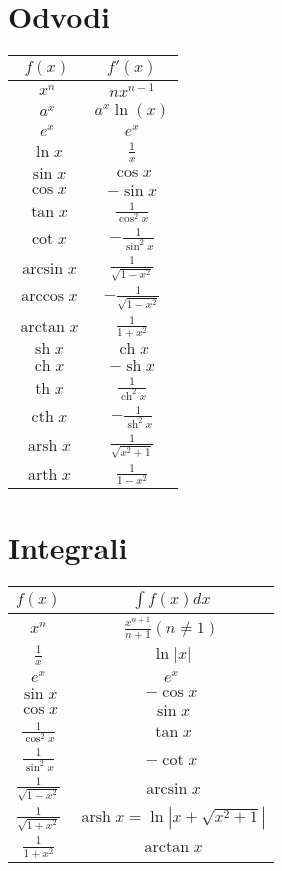 \documentclass[a4paper,oneside,10pt]{article}
\title{\Title}
\author{\Author}
\date{\today}
\theoremstyle{definition}
\DeclareMathOperator\ch{ch}
\DeclareMathOperator\sh{sh}
\DeclareMathOperator\Th{th}  %
\DeclareMathOperator\cth{cth}
\DeclareMathOperator\arsh{arsh}
\DeclareMathOperator\arth{arth}
\newcommand\abs[1]{\left|#1\right|}
\begin{document}
\begin{multicols}{2}
	\section*{Odvodi}
	\begin{tabular}[h]{|c|c|}
		\hline
		$f(x)$ & $f'(x)$ \\
		\hline
		$x^n$ & $nx^{n-1}$\\
		$a^x$ & $a^x\ln(x)$\\
		$e^x$ & $e^x$\\
		$\ln{x}$ & $\frac{1}{x}$\\
		$\sin{x}$ & $\cos{x}$\\
		$\cos{x}$ & $-\sin{x}$\\
		$\tan{x}$ & $\frac{1}{\cos^2{x}}$\\
		$\cot{x}$ & $-\frac{1}{\sin^2{x}}$\\
		$\arcsin{x}$ & $\frac{1}{\sqrt{1-x^2}}$\\
		$\arccos{x}$ & $-\frac{1}{\sqrt{1-x^2}}$\\
		$\arctan{x}$ & $\frac{1}{1+x^2}$\\
		$\sh{x}$ & $\ch{x}$\\
		$\ch{x}$ & $-\sh{x}$\\
		$\Th{x}$ & $\frac{1}{\ch^2{x}}$\\
		$\cth{x}$ & $-\frac{1}{\sh^2{x}}$\\
		$\arsh{x}$ & $\frac{1}{\sqrt{x^2+1}}$\\
		$\arth{x}$ & $\frac{1}{1-x^2}$\\
		\hline 

	\end{tabular}
%
	\section*{Integrali}
	\begin{tabular}[h]{|c|c|}
		\hline
		$f(x)$ & $\int f(x)dx$ \\
		\hline
		$x^n$ & $\frac{x^{n+1}}{n+1} (n \neq 1)$ \\
		$\frac{1}{x}$ & $\ln{\abs{x}}$ \\
		$e^x$ & $e^x$\\
		$\sin{x}$ & $-\cos{x}$\\
		$\cos{x}$ & $\sin{x}$\\
		$\frac{1}{\cos^2{x}}$ & $\tan{x}$\\
		$\frac{1}{\sin^2{x}}$ & $-\cot{x}$\\
		$\frac{1}{\sqrt{1-x^2}}$ & $\arcsin{x}$\\
		$\frac{1}{\sqrt{1+x^2}}$ & $\arsh{x} = \ln{\abs{x + \sqrt{x^2 + 1}}}$\\
		$\frac{1}{1+x^2}$ & $\arctan{x}$\\


\end{tabular}
\end{multicols}
\end{document}
